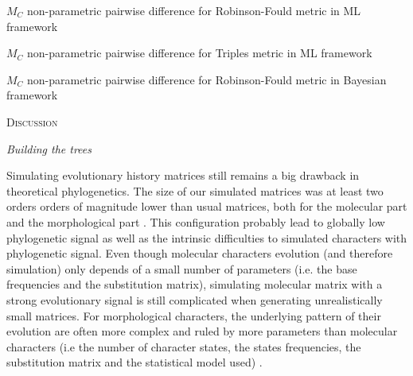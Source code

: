 \documentclass[12pt,letterpaper]{article}
\renewcommand{\section}[1]{%
\bigskip
\begin{center}
\begin{Large}
\normalfont\scshape #1
\medskip
\end{Large}
\end{center}}
\renewcommand{\subsection}[1]{%
\bigskip
\begin{center}
\begin{large}
\normalfont\itshape #1
\end{large}
\end{center}}
\begin{document}
\begin{table}
  \centering
  \linespread{1.0}
  \caption{$M_C$ non-parametric pairwise difference for Robinson-Fould metric in ML framework} 
  
  \label{ML_RF-MC_results}
\end{table}

\begin{table}
  \centering
  \linespread{1.0}
  \caption{$M_C$ non-parametric pairwise difference for Triples metric in ML framework} 
  
  \label{ML_Tr-MC_results}
\end{table}

\begin{table}
  \centering
  \linespread{1.0}
  \caption{$M_C$ non-parametric pairwise difference for Robinson-Fould metric in Bayesian framework}
  
  \label{Ba_RF-MC_results}
\end{table}

%
%

\section{Discussion}


\subsection{Building the trees}
Simulating evolutionary history matrices still remains a big drawback in theoretical phylogenetics. %
The size of our simulated matrices was at least two orders orders of magnitude lower than usual matrices, both for the molecular part \citep[e.g.][]{springermacroevolutionary2012} and the morphological part \citep[e.g.][]{nithe2013}. %
This configuration probably lead to globally low phylogenetic signal as well as the intrinsic difficulties to simulated characters with phylogenetic signal.
Even though molecular characters evolution (and therefore simulation) only depends of a small number of parameters (i.e. the base frequencies and the substitution matrix), simulating molecular matrix with a strong evolutionary signal is still complicated when generating unrealistically small matrices.
For morphological characters, the underlying pattern of their evolution are often more complex and ruled by more parameters than molecular characters (i.e the number of character states, the states frequencies, the substitution matrix and the statistical model used) \citep{Pagel22011994,wagner2000,lewisa2001}.
\end{document}
